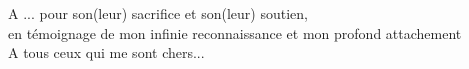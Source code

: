 \thispagestyle{empty}
%

\begin{center}
  {\it

    A ... pour son(leur) sacrifice et son(leur) soutien, \\
    en témoignage de mon infinie reconnaissance et mon profond attachement \\
    \vspace{1cm}
    A tous ceux qui me sont chers...

  }
\end{center}

%
%
